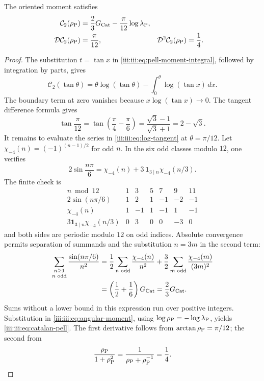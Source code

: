 \begin{theorem}
\label{iii:iii:thm:catalan-pell}
The oriented moment satisfies
\begin{align}
 \mathcal C_2(\rho_{\rm P})
 &=\frac23G_{\rm Cat}-\frac{\pi}{12}\log\lambda_{\rm P},
 \label{iii:iii:eq:catalan-pell}\\
 \mathcal D\mathcal C_2(\rho_{\rm P})&=\frac{\pi}{12},&
 \mathcal D^2\mathcal C_2(\rho_{\rm P})&=\frac14.
 \label{iii:iii:eq:catalan-pell-derivatives}
\end{align}
\end{theorem}
\begin{proof}
The substitution $t=\tan x$ in \eqref{iii:iii:eq:pell-moment-integral},
followed by integration by parts, gives
\begin{equation}
 \mathcal C_2(\tan\theta)
 =\theta\log(\tan\theta)
   -\int_0^\theta\log(\tan x)\,dx.
 \label{iii:iii:eq:angular-moment}
\end{equation}
The boundary term at zero vanishes because $x\log(\tan x)\to0$.
The tangent difference formula gives
\[
 \tan\frac{\pi}{12}
 =\tan\left(\frac\pi4-\frac\pi6\right)
 =\frac{\sqrt3-1}{\sqrt3+1}=2-\sqrt3.
\]
It remains to evaluate the series in \eqref{iii:iii:eq:log-tangent} at
$\theta=\pi/12$. Let $\chi_{-4}(n)=(-1)^{(n-1)/2}$ for odd $n$.
In the six odd classes modulo $12$, one verifies
\begin{equation}
 2\sin\frac{n\pi}{6}
 =\chi_{-4}(n)+3\,\mathbf1_{3\mid n}\chi_{-4}(n/3).
 \label{iii:iii:eq:character-pell}
\end{equation}
The finite check is
\[
\begin{array}{c|rrrrrr}
 n\bmod12&1&3&5&7&9&11\\ \hline
 2\sin(n\pi/6)&1&2&1&-1&-2&-1\\
 \chi_{-4}(n)&1&-1&1&-1&1&-1\\
 3\mathbf1_{3\mid n}\chi_{-4}(n/3)&0&3&0&0&-3&0
\end{array}
\]
and both sides are periodic modulo $12$ on odd indices.
Absolute convergence permits separation of summands and the substitution $n=3m$
in the second term:
\begin{align*}
 \sum_{\substack{n\geq1\\n\text{ odd}}}
       \frac{\sin(n\pi/6)}{n^2}
 &=\frac12\sum_{n\text{ odd}}\frac{\chi_{-4}(n)}{n^2}
  +\frac32\sum_{m\text{ odd}}\frac{\chi_{-4}(m)}{(3m)^2}\\
 &=\left(\frac12+\frac16\right)G_{\rm Cat}
 =\frac23G_{\rm Cat}.
\end{align*}
Sums without a lower bound in this expression run over positive
integers. Substitution in \eqref{iii:iii:eq:angular-moment}, using
$\log\rho_{\rm P}=-\log\lambda_{\rm P}$, yields
\eqref{iii:iii:eq:catalan-pell}. The first derivative follows from
$\arctan\rho_{\rm P}=\pi/12$; the second from
\[
 \frac{\rho_{\rm P}}{1+\rho_{\rm P}^2}
 =\frac1{\rho_{\rm P}+\rho_{\rm P}^{-1}}=\frac14.
\]
\end{proof}

